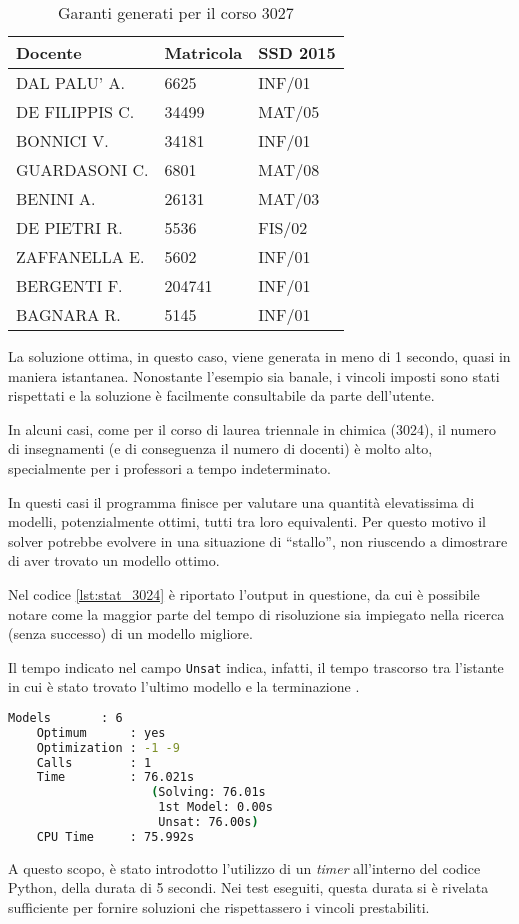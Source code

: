 \begin{table}[!ht]
    \caption{Garanti generati per il corso 3027}
    \centering
    \begin{tabular}{|l|l|l|}
    \hline
        Docente & Matricola & SSD 2015 \\ \hline
        DAL PALU' A. & 6625 & INF/01 \\ \hline
        DE FILIPPIS C. & 34499 & MAT/05 \\ \hline
        BONNICI V. & 34181 & INF/01 \\ \hline
        GUARDASONI C. & 6801 & MAT/08 \\ \hline
        BENINI A. & 26131 & MAT/03 \\ \hline
        DE PIETRI R. & 5536 & FIS/02 \\ \hline
        ZAFFANELLA E. & 5602 & INF/01 \\ \hline
        BERGENTI F. & 204741 & INF/01 \\ \hline
        BAGNARA R. & 5145 & INF/01 \\ \hline
    \end{tabular}
\end{table}

La soluzione ottima, in questo caso, viene generata in meno di 1 secondo, 
quasi in maniera istantanea. 
Nonostante l'esempio sia banale, i vincoli imposti sono stati rispettati 
e la soluzione è facilmente consultabile da parte dell'utente.

In alcuni casi, come per il corso di laurea triennale in chimica (3024), 
il numero di insegnamenti (e di conseguenza il numero di docenti) è molto 
alto, specialmente per i professori a tempo indeterminato. 

In questi casi il programma finisce per valutare una quantità elevatissima 
di modelli, potenzialmente ottimi, tutti tra loro equivalenti. Per questo 
motivo il solver potrebbe evolvere in una situazione di ``stallo'', non 
riuscendo a dimostrare di aver trovato un modello ottimo.

Nel codice \ref{lst:stat_3024} è riportato l'output in questione, da cui è 
possibile notare come la maggior parte del tempo di risoluzione sia impiegato nella 
ricerca (senza successo) di un modello migliore.

Il tempo indicato nel campo \texttt{Unsat} indica, infatti, il tempo trascorso tra 
l'istante in cui è stato trovato l'ultimo modello e la terminazione \cite{gebser2015potassco}.

\begin{lstlisting}[language=bash, captionpos=b, 
    caption={Statistiche clingo per il corso 3024}, 
    label={lst:stat_3024},
    backgroundcolor=\color{lightgray!20},
    basicstyle=\ttfamily\footnotesize]
    Models       : 6
    Optimum      : yes
    Optimization : -1 -9
    Calls        : 1
    Time         : 76.021s 
                    (Solving: 76.01s 
                     1st Model: 0.00s 
                     Unsat: 76.00s)
    CPU Time     : 75.992s
\end{lstlisting}

A questo scopo, è stato introdotto l'utilizzo di un \textit{timer} all'interno 
del codice Python, della durata di 5 secondi.
Nei test eseguiti, questa durata si è rivelata sufficiente per fornire soluzioni 
che rispettassero i vincoli prestabiliti.

